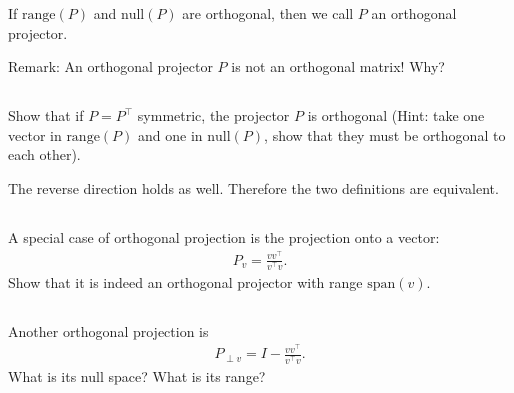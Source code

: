 \documentclass{article}%
\begin{document}
If $\text{range}(  P)$ and $\text{null}(  P)$ are orthogonal, then we call $  P$ an orthogonal projector.


Remark: An orthogonal projector $  P$ is not an orthogonal matrix! Why?

\subsection{}
Show that if $  P=  P^\top$ symmetric, the projector $  P$ is orthogonal (Hint: take one vector in $\text{range}(  P)$ and one in $\text{null}(  P)$, show that they must be orthogonal to each other). 

The reverse direction holds as well. Therefore the two definitions are equivalent.

\subsection{}
A special case of orthogonal projection is the projection onto a vector:
\begin{align*}
      P_v = \frac{  v   v^\top}{  v^\top   v}.
\end{align*}
Show that it is indeed an orthogonal projector with range $\text{span}(  v)$.

\subsection{}
Another orthogonal projection is
\begin{align*}
      P_{\perp v} = I-\frac{  v   v^\top}{  v^\top   v}.
\end{align*}
What is its null space? What is its range?
\end{document}
